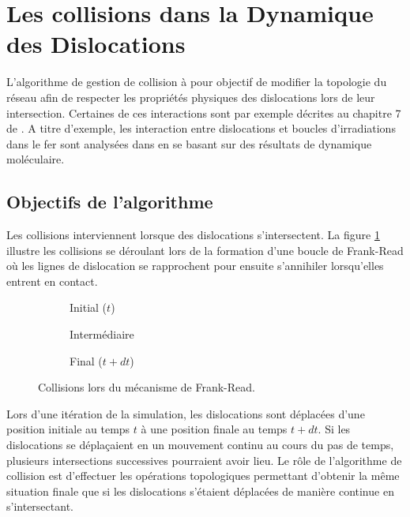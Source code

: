 \documentclass[11pt,class=article,float=false,crop=false]{standalone}
\begin{document}
	
\section{Les collisions dans la Dynamique des Dislocations}

L'algorithme de gestion de collision à pour objectif de modifier la topologie du réseau afin de respecter les propriétés physiques des dislocations lors de leur intersection. Certaines de ces interactions sont par exemple décrites au chapitre 7 de . A titre d'exemple, les interaction entre dislocations et boucles d'irradiations dans le fer sont analysées dans  en se basant sur des résultats de dynamique moléculaire.

\subsection{Objectifs de l'algorithme}

Les collisions interviennent lorsque des dislocations s'intersectent. La figure \ref{fig:collision_frankread} illustre les collisions se déroulant lors de la formation d'une boucle de Frank-Read  où les lignes de dislocation se rapprochent pour ensuite s'annihiler lorsqu'elles entrent en contact.

\begin{figure}[H]
	\centering
	\begin{subfigure}[b]{0.32\textwidth}
		\centering
		\caption{Initial ($t$)}
	\end{subfigure}
	\begin{subfigure}[b]{0.32\textwidth}
		\centering
		\caption{Intermédiaire}
	\end{subfigure}
	\begin{subfigure}[b]{0.32\textwidth}
		\centering
		\caption{Final ($t+dt$)}
	\end{subfigure}
	\caption{Collisions lors du mécanisme de Frank-Read.}
	\label{fig:collision_frankread}
\end{figure}

Lors d'une itération de la simulation, les dislocations sont déplacées d'une position initiale au temps $t$ à une position finale au temps $t+dt$. Si les dislocations se déplaçaient en un mouvement continu au cours du pas de temps, plusieurs intersections successives pourraient avoir lieu. Le rôle de l'algorithme de collision est d'effectuer les opérations topologiques permettant d'obtenir la même situation finale que si les dislocations s'étaient déplacées de manière continue en s'intersectant.
\end{document}
